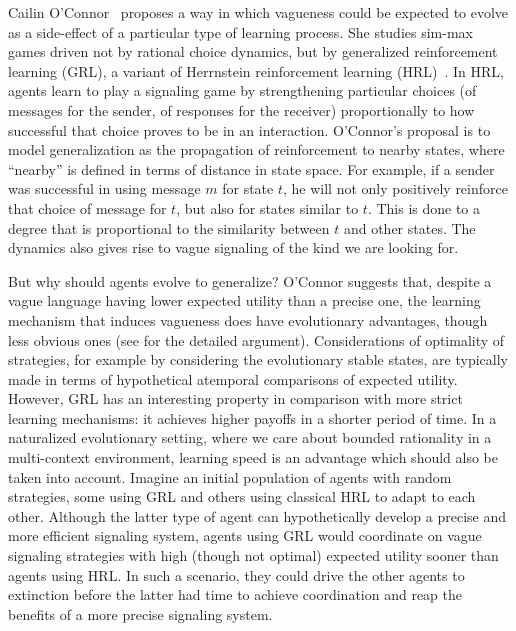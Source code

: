 \documentclass[a4paper]{article}
\begin{document}
Cailin O'Connor~\parencite*{oconnor_evolution_2014} proposes a way in which vagueness could be expected to evolve as a side-effect of a particular type of learning process.
She studies sim-max games driven not by rational choice dynamics, but by generalized reinforcement learning (GRL), a variant of Herrnstein reinforcement learning (HRL)~\parencite{roth_learning_1995}.
In HRL, agents learn to play a signaling game by strengthening particular choices (of messages for the sender, of responses for the receiver) proportionally to how successful that choice proves to be in an interaction.
O'Connor's proposal is to model generalization as the propagation of reinforcement to nearby states, where ``nearby'' is defined in terms of distance in state space.
For example, if a sender was successful in using message $m$ for state $t$, he will not only positively reinforce that choice of message for $t$, but also for states similar to $t$.
This is done to a degree that is proportional to the similarity between $t$ and other states.
The dynamics also gives rise to vague signaling of the kind we are looking for.

But why should agents evolve to generalize?
O'Connor suggests that, despite a vague language having lower expected utility than a precise one, the learning mechanism that induces vagueness does have evolutionary advantages, though less obvious ones (see \textcite{oconnor_evolving_2015} for the detailed argument).
Considerations of optimality of strategies, for example by considering the evolutionary stable states, are typically made in terms of hypothetical atemporal comparisons of expected utility.
However, GRL has an interesting property in comparison with more strict learning mechanisms: it achieves higher payoffs in a shorter period of time.
In a naturalized evolutionary setting, where we care about bounded rationality in a multi-context environment, learning speed is an advantage which should also be taken into account.
Imagine an initial population of agents with random strategies, some using GRL and others using classical HRL to adapt to each other.
Although the latter type of agent can hypothetically develop a precise and more efficient signaling system, agents using GRL would coordinate on vague signaling strategies with high (though not optimal) expected utility sooner than agents using HRL.
In such a scenario, they could drive the other agents to extinction before the latter had time to achieve coordination and reap the benefits of a more precise signaling system.
\end{document}
